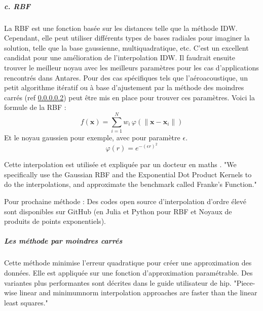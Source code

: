 
\subparagraph{c. RBF}
La \ac{RBF} est une fonction basée sur les distances telle que la méthode IDW. Cependant, elle peut utiliser différents types de bases radiales pour imaginer la solution, telle que la base gaussienne, multiquadratique, etc. C'est un excellent candidat pour une amélioration de l'interpolation IDW. Il faudrait ensuite trouver le meilleur noyau avec les meilleurs paramètres pour les cas d'applications rencontrés dans Antares. Pour des cas spécifiques tels que l'aéroacoustique, un petit algorithme itératif ou à base d'ajustement par la méthode des moindres carrés (ref \ref{mc}) peut être mis en place pour trouver ces paramètres.
Voici la formule de la RBF :
\[
f(\mathbf{x}) = \sum_{i=1}^{N} w_{i} \, \varphi \left( \|\mathbf{x} - \mathbf{x}_{i}\| \right)
\]
Et le noyau gaussien pour exemple, avec pour paramètre \(\epsilon\).
\[
\varphi(r) = e^{-(\epsilon r)^{2}}
\]


Cette interpolation est utilisée et expliquée par un docteur en maths \cite{Rosenfeld}.%
"We specifically use the Gaussian RBF and the Exponential Dot Product Kernels to do the interpolations, and approximate the benchmark called Franke's Function." \cite{opensource_2}

Pour prochaine méthode : Des codes open source d'interpolation d'ordre élevé sont disponibles sur GitHub (en Julia \cite{opensource} et Python \cite{opensource_2} pour RBF et Noyaux de produits de points exponentiels).

\subparagraph{Les méthode par moindres carrés}\label{mc}

Cette méthode minimise l'erreur quadratique pour créer une approximation des données. Elle est appliquée sur une fonction d'approximation paramétrable. Des variantes plus performantes sont décrites dans le guide utilisateur de hip.
"Piece-wise linear and minimumnorm interpolation approaches are faster than the linear least squares." \cite{muller2020}


